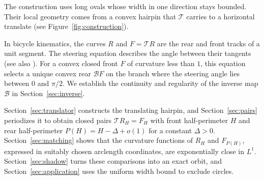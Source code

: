\documentclass[11pt]{article}
\numberwithin{equation}{section}
\newcommand{\Tmap}{\mathcal T}
\newcommand{\Bmap}{\mathcal B}
\begin{document}
The construction uses long ovals whose width in one direction stays bounded. Their local
geometry comes from a convex hairpin that \(\Tmap\) carries to a
horizontal translate (see Figure~\ref{fig:construction}).

In bicycle kinematics, the curves \(R\) and \(F=\Tmap R\) are the rear and front
tracks of a unit segment. The steering equation describes the angle
between their tangents \cite[Section~2]{LeviTabachnikov} (see also
\cite[Proposition~2.6]{BorLeviPerlineTabachnikov2020}). For a convex closed
front \(F\) of curvature less than \(1\), this equation selects a unique convex
rear \(\Bmap F\) on the branch where the steering angle lies between \(0\) and
\(\pi/2\). We establish the continuity and regularity of the inverse map
\(\Bmap\) in Section~\ref{sec:inverse}.

Section~\ref{sec:translator} constructs the translating hairpin, and
Section~\ref{sec:pairs} periodizes it to obtain closed pairs
\(\Tmap R_H=F_H\) with front half-perimeter \(H\) and rear half-perimeter
\(P(H)=H-\Delta+o(1)\) for a constant \(\Delta>0\). Section~\ref{sec:matching}
shows that the curvature functions of \(R_H\) and \(F_{P(H)}\), expressed in
suitably chosen arclength coordinates, are exponentially close in \(L^1\).
Section~\ref{sec:shadow} turns these comparisons into an exact orbit, and
Section~\ref{sec:application} uses the uniform width bound to exclude circles.
\end{document}
